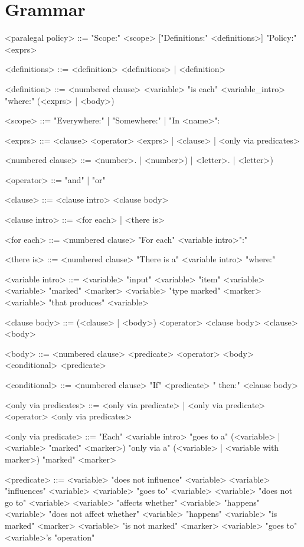 \appendix

\chapter{Grammar}
\label{sec:grammar}

\begin{grammar}
<paralegal policy> ::= 
    "Scope:" <scope> 
    ["Definitions:" <definitions>] 
    "Policy:" <exprs>

<definitions> ::= <definition> <definitions> | <definition>

<definition> ::=
	<numbered clause> <variable> "is each" <variable_intro> "where:" (<exprs> | <body>)

<scope> ::= "Everywhere:" | "Somewhere:" | "In <name>":

<exprs> ::= 
	<clause> <operator> <exprs> |
	<clause> |
	<only via predicates>

<numbered clause> ::= <number>. | <number>) | <letter>. | <letter>)

<operator> ::= "and" | "or"

<clause> ::= <clause intro> <clause body>

<clause intro> ::= <for each> | <there is>

<for each> ::= <numbered clause> "For each" <variable intro>":"

<there is> ::= <numbered clause> "There is a" <variable intro> "where:"

<variable intro> ::= <variable> "input"
    \alt <variable> "item"
	\alt <variable>
	\alt <variable> "marked" <marker>
	\alt <variable> "type marked" <marker>
	\alt <variable> "that produces" <variable>

<clause body> ::= (<clause> | <body>) <operator> <clause body> 
	\alt <clause>
	\alt <body>

<body> ::= <numbered clause> <predicate> <operator> <body> 
    \alt <conditional> 
     <predicate>

<conditional> ::= <numbered clause> "If" <predicate> " then:" <clause body> 

<only via predicates> ::= <only via predicate> | <only via predicate> <operator> <only via predicates>

<only via predicate> ::= 
	"Each" <variable intro> "goes to a" 
    (<variable> | <variable> "marked" <marker>) 
	"only via a" (<variable> | <variable with marker>)
    "marked" <marker>

<predicate> ::= <variable> "does not influence" <variable>
    \alt <variable> "influences" <variable>
	\alt <variable> "goes to" <variable>
	\alt <variable> "does not go to" <variable>
	\alt <variable> "affects whether" <variable> "happens"
	\alt <variable> "does not affect whether" <variable> "happens"
	\alt <variable> "is marked" <marker>
	\alt <variable> "is not marked" <marker>
	\alt <variable> "goes to" <variable>'s "operation"
\end{grammar}
